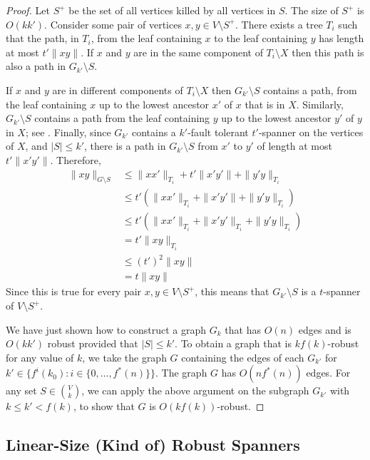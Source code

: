 \documentclass{patmorin}
\begin{document}
\begin{proof}
  Let $S^+$ be the set of all vertices killed by all vertices in $S$.
  The size of $S^+$ is $O(kk')$. Consider some pair of vertices $x,y\in
  V\setminus S^+$.  There exists a tree $T_i$ such that the path, in
  $T_i$, from the leaf containing $x$ to the leaf containing $y$ has
  length at most $t'\|xy\|$.  If $x$ and $y$ are in the same component of
  $T_i\setminus X$ then this path is also a path in $G_{k'}\setminus S$.

  If $x$ and $y$ are in different components of $T_i\setminus X$ then
  $G_{k'}\setminus S$ contains a path, from the leaf containing $x$
  up to the lowest ancestor $x'$ of $x$ that is in $X$.  Similarly,
  $G_{k'}\setminus S$ contains a path from the leaf containing $y$ up to
  the lowest ancestor $y'$ of $y$ in $X$; see .
  Finally, since $G_{k'}$ contains a $k'$-fault tolerant $t'$-spanner
  on the vertices of $X$, and $|S|\le k'$, there is a path in
  $G_{k'}\setminus S$ from $x'$ to $y'$ of length at most $t'\|x'y'\|$.
  Therefore,
  \begin{align*}
    \|xy\|_{G\setminus S} 
       & \le \|xx'\|_{T_i} + t'\|x'y'\| + \|y'y\|_{T_i} \\
       & \le t'(\|xx'\|_{T_i} + \|x'y'\| + \|y'y\|_{T_i}) \\
       & \le t'(\|xx'\|_{T_i} + \|x'y'\|_{T_i} + \|y'y\|_{T_i}) \\
       &  = t'\|xy\|_{T_i} \\
       & \le (t')^2\|xy\|  \\
       & = t\|xy\|
  \end{align*}
  Since this is true for every pair $x,y\in V\setminus S^+$, this means
  that $G_{k'}\setminus S$ is a $t$-spanner of $V\setminus S^+$.

  We have just shown how to construct a graph $G_k$ that has $O(n)$
  edges and is $O(kk')$ robust provided that $|S|\le k'$.  To obtain
  a graph that is $kf(k)$-robust for any value of $k$, we take the
  graph $G$ containing the edges of each $G_{k'}$ for $k'\in\{f^i(k_0) :
  i\in\{0,\ldots,f^*(n)\}\}$.  The graph $G$ has $O(nf^*(n))$ edges.
  For any set $S\in \binom{V}{k}$, we can apply the above argument
  on the subgraph $G_{k'}$ with $k \le k' < f(k)$, to show that $G$
  is $O(kf(k))$-robust.
\end{proof}

\subsection{Linear-Size (Kind of) Robust Spanners}
\end{document}
